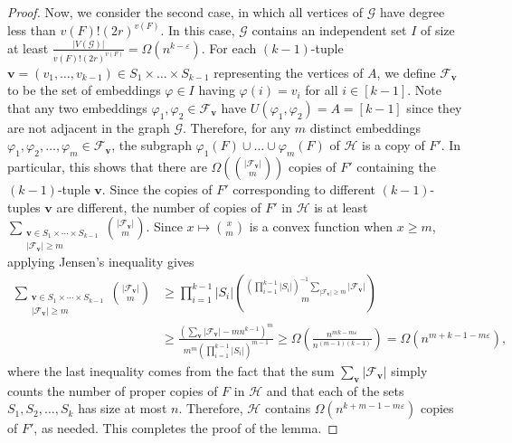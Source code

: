 \documentclass[11pt]{article}
\numberwithin{equation}{section}
\def\eps{\varepsilon}
\def\cF{\mathcal{F}}
\def\cG{\mathcal{G}}
\def\cH{\mathcal{H}}
\theoremstyle{plain}
\theoremstyle{remark}
\begin{document}
\begin{proof}
Now, we consider the second case, in which all vertices of $\cG$ have degree less than $v(F)!(2r)^{v(F)}$. In this case, $\cG$ contains an independent set $I$ of size at least $\frac{|V(\cG)|}{v(F)!(2r)^{v(F)}}=\Omega(n^{k-\eps})$. For each $(k-1)$-tuple $\mathbf{v}=(v_1, \dots, v_{k-1})\in S_1\times\dots\times S_{k-1}$ representing the vertices of $A$, we define $\cF_{\mathbf{v}}$ to be the set of embeddings $\varphi\in I$ having $\varphi(i)=v_i$ for all $i\in [k-1]$. Note that any two embeddings $\varphi_1, \varphi_2\in \cF_{\mathbf{v}}$ have $U(\varphi_1, \varphi_2)=A=[k-1]$ since they are not adjacent in the graph $\cG$. Therefore, for any $m$ distinct embeddings $\varphi_1, \varphi_2, \ldots, \varphi_m \in \cF_{\mathbf{v}}$, the subgraph $\varphi_1(F)\cup \ldots \cup \varphi_m(F)$ of $\cH$ is a copy of $F'$. In particular, this shows that there are $\Omega\left(\binom{|\cF_{\mathbf{v}}|}{m}\right)$ copies of $F'$ containing the $(k-1)$-tuple $\mathbf{v}$. Since the copies of $F'$ corresponding to different $(k-1)$-tuples $\mathbf{v}$ are different, the number of copies of $F'$ in $\cH$ is at least $\sum_{\substack{\mathbf{v}\in S_1\times\cdots\times S_{k-1}\\|\cF_{\mathbf{v}}|\geq m}} \binom{|\cF_{\mathbf{v}}|}{m}$. Since $x\mapsto \binom{x}{m}$ is a convex function when $x\geq m$, applying Jensen's inequality gives
\begin{align*}
    \sum_{\substack{\mathbf{v}\in S_1\times\cdots\times S_{k-1}\\|\cF_{\mathbf{v}}|\geq m}} \binom{|\cF_{\mathbf{v}}|}{m}&\geq \prod_{i=1}^{k-1}|S_i|\binom{(\prod_{i=1}^{k-1}|S_i|)^{-1}\sum_{|\cF_{\mathbf{v}}|\geq m} |\cF_{\mathbf{v}}|}{m} \\&\geq \frac{\left(\sum_{\mathbf{v}} |\cF_{\mathbf{v}}|-mn^{k-1}\right)^m}{m^m (\prod_{i=1}^{k-1}|S_i|)^{m-1}}
    \geq \Omega\left(\frac{n^{mk-m\eps}}{n^{(m-1)(k-1)}}\right)= \Omega\left(n^{m+k-1-m\eps}\right),
\end{align*}
where the last inequality comes from the fact that the sum $\sum_{\mathbf{v}} |\cF_{\mathbf{v}}|$ simply counts the number of proper copies of $F$ in $\cH$ and that each of the sets $S_1, S_2, \ldots, S_k$ has size at most $n$. Therefore, $\cH$ contains $\Omega(n^{k+m-1-m\eps})$ copies of $F'$, as needed. This completes the proof of the lemma.
\end{proof}
\end{document}
